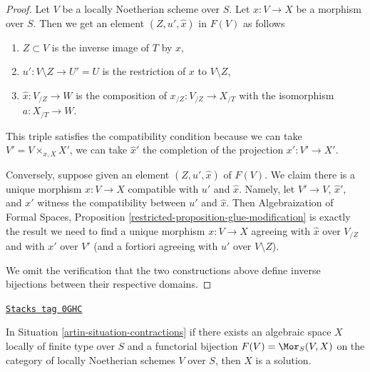 \begin{proof}
Let $V$ be a locally Noetherian scheme over $S$.
Let $x : V \to X$ be a morphism over $S$.
Then we get an element $(Z, u', \hat x)$ in $F(V)$ as follows
\begin{enumerate}
\item $Z \subset V$ is the inverse image of $T$ by $x$,
\item $u' : V \setminus Z \to U' = U$ is the restriction of
$x$ to $V \setminus Z$,
\item $\hat x : V_{/Z} \to W$ is the composition of
$x_{/Z} : V_{/Z} \to X_{/T}$ with the isomorphism $a : X_{/T} \to W$.
\end{enumerate}
This triple satisfies the compatibility condition because we
can take $V' = V \times_{x, X} X'$, we can take $\hat x'$
the completion of the projection $x' : V' \to X'$.

\medskip\noindent
Conversely, suppose given an element $(Z, u', \hat x)$ of $F(V)$. We claim
there is a unique morphism $x : V \to X$ compatible with $u'$ and $\hat x$.
Namely, let $V' \to V$, $\hat x'$, and $x'$ witness the
compatibility between $u'$ and $\hat x$. Then
Algebraization of Formal Spaces, Proposition
\ref{restricted-proposition-glue-modification}
is exactly the result we need to find
a unique morphism $x : V \to X$ agreeing with
$\hat x$ over $V_{/Z}$ and with $x'$ over $V'$ (and a fortiori
agreeing with $u'$ over $V \setminus Z$).

\medskip\noindent
We omit the verification that the two constructions above define inverse
bijections between their respective domains.
\end{proof}

\begin{lemma}
\label{artin-lemma-functor-is-solution}
\href{https://stacks.math.columbia.edu/tag/0GHC}{\texttt{Stacks tag 0GHC}}

In Situation \ref{artin-situation-contractions} if there exists an
algebraic space $X$ locally of finite type over $S$ and a
functorial bijection $F(V) = \Mor_S(V, X)$ on the category of
locally Noetherian schemes $V$ over $S$, then $X$ is a solution.
\end{lemma}

